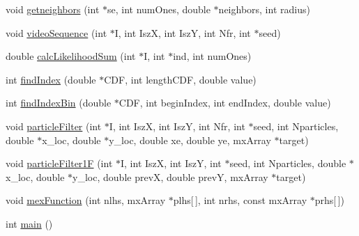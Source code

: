 \begin{DoxyCompactItemize}
\item 
void \hyperlink{ex__particle__CUDA__naive__full_8cu_a2a8357e06057d48a030afcb481081349}{getneighbors} (int $\ast$se, int numOnes, double $\ast$neighbors, int radius)
\item 
void \hyperlink{ex__particle__CUDA__naive__full_8cu_a2925e128f88b60e0904210704e5ff7f5}{videoSequence} (int $\ast$I, int IszX, int IszY, int Nfr, int $\ast$seed)
\item 
double \hyperlink{ex__particle__CUDA__naive__full_8cu_a875b89dec232da58dee8863b7d673808}{calcLikelihoodSum} (int $\ast$I, int $\ast$ind, int numOnes)
\item 
int \hyperlink{ex__particle__CUDA__naive__full_8cu_a71e946a9752dba5f8f3def41e58a8469}{findIndex} (double $\ast$CDF, int lengthCDF, double value)
\item 
int \hyperlink{ex__particle__CUDA__naive__full_8cu_a0952c4d9efa944180ca6deb470239fba}{findIndexBin} (double $\ast$CDF, int beginIndex, int endIndex, double value)
\item 
void \hyperlink{ex__particle__CUDA__naive__full_8cu_af4a42e8ccaa39f6b7e531ce26ef10e85}{particleFilter} (int $\ast$I, int IszX, int IszY, int Nfr, int $\ast$seed, int Nparticles, double $\ast$x\_\-loc, double $\ast$y\_\-loc, double xe, double ye, mxArray $\ast$target)
\item 
void \hyperlink{ex__particle__CUDA__naive__full_8cu_a822a6fc6a33cafc1167c91a7314623e8}{particleFilter1F} (int $\ast$I, int IszX, int IszY, int $\ast$seed, int Nparticles, double $\ast$x\_\-loc, double $\ast$y\_\-loc, double prevX, double prevY, mxArray $\ast$target)
\item 
void \hyperlink{ex__particle__CUDA__naive__full_8cu_a6a215cbfde54f82a3ce599228fc3fce5}{mexFunction} (int nlhs, mxArray $\ast$plhs\mbox{[}$\,$\mbox{]}, int nrhs, const mxArray $\ast$prhs\mbox{[}$\,$\mbox{]})
\item 
int \hyperlink{ex__particle__CUDA__naive__full_8cu_ae66f6b31b5ad750f1fe042a706a4e3d4}{main} ()
\end{DoxyCompactItemize}
